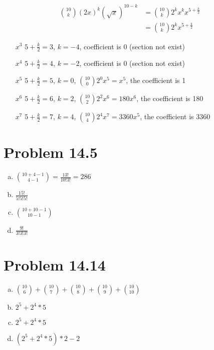 \documentclass{article}
\def\math#1{$#1$}
\begin{document}
\begin{equation}
    \begin{split}
        \binom{10}{k} (2x)^k (\sqrt{x})^{10-k} &= \binom{10}{k} 2^kx^k x^{5+\frac{k}{2}} \\
        &= \binom{10}{k} 2^k x^{5+\frac{k}{2}}
    \end{split}
\end{equation}

\begin{itemize}
    \item [\math{x^3}] \math{5+\frac{k}{2} = 3}, \math{k = -4}, coefficient is \math{0} (section not exist)
    \item [\math{x^4}] \math{5+\frac{k}{2} = 4}, \math{k = -2}, coefficient is \math{0} (section not exist)
    \item [\math{x^5}] \math{5+\frac{k}{2} = 5}, \math{k = 0}, \math{\binom{10}{0} 2^0 x^5 = x^5}, the coefficient is 1
    \item [\math{x^6}] \math{5+\frac{k}{2} = 6}, \math{k = 2}, \math{\binom{10}{2} 2^2 x^6 = 180 x^6}, the coefficient is 180
    \item [\math{x^7}] \math{5+\frac{k}{2} = 7}, \math{k = 4}, \math{\binom{10}{4} 2^4 x^7 = 3360 x^5}, the coefficient is 3360
\end{itemize}

\section{Problem 14.5}
\begin{enumerate}[a)]
    \item \math{\binom{10 + 4 - 1}{4 - 1} = \frac{13!}{10!3!} = 286}
    \item \math{\frac{15!}{5!5!5!}}
    \item \math{\binom{10 + 10 - 1}{10 - 1}}
    \item \math{\frac{9!}{3!3!3!}}
\end{enumerate}

\section{Problem 14.14}
\begin{enumerate}[a)]
    \item \math{\binom{10}{6} + \binom{10}{7} + \binom{10}{8} + \binom{10}{9} + \binom{10}{10}}
    \item \math{2^5 + 2^4 * 5}
    \item \math{2^5 + 2^4 * 5}
    \item \math{(2^5 + 2^4 * 5) * 2 - 2}
\end{enumerate}
\end{document}
